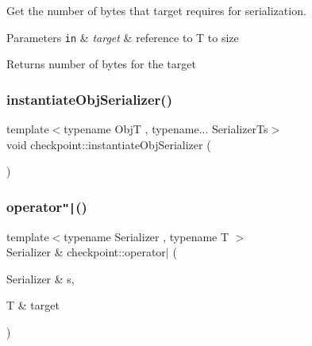 Get the number of bytes that {\ttfamily target} requires for serialization. 


\begin{DoxyParams}[1]{Parameters}
\mbox{\tt in}  & {\em target} & reference to {\ttfamily T} to size\\
\hline
\end{DoxyParams}
\begin{DoxyReturn}{Returns}
number of bytes for the {\ttfamily target} 
\end{DoxyReturn}
\mbox{\label{namespacecheckpoint_a09875c2d3c012be868f3fd88b3ed55be}} 
\subsubsection{\texorpdfstring{instantiate\+Obj\+Serializer()}{instantiateObjSerializer()}}
{\footnotesize\ttfamily template$<$typename ObjT , typename... Serializer\+Ts$>$ \\
void checkpoint\+::instantiate\+Obj\+Serializer (\begin{DoxyParamCaption}{ }\end{DoxyParamCaption})\hspace{0.3cm}{\ttfamily [inline]}}

\mbox{\label{namespacecheckpoint_a5c9a1c4d05ec6880270c9a6d0dded825}} 
\subsubsection{\texorpdfstring{operator\texttt{"|}()}{operator|()}}
{\footnotesize\ttfamily template$<$typename Serializer , typename T $>$ \\
Serializer \& checkpoint\+::operator$\vert$ (\begin{DoxyParamCaption}\item[{Serializer \&}]{s,  }\item[{T \&}]{target }\end{DoxyParamCaption})\hspace{0.3cm}{\ttfamily [inline]}}

\mbox{\label{namespacecheckpoint_a6254f2e220f905a2b0c797c08092a7a1}} 
